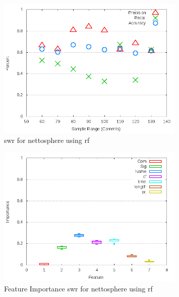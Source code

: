 \begin{figure}[!t]
\centering
\includegraphics[width=0.8\textwidth]{images/rf/test_1/nettosphere_sample_range.png}
\caption{\gls{swr} for nettosphere using \gls{rf}}
\label{fig:test_1_nettosphere_rf}
\end{figure}

\begin{figure}[!t]
\centering
\includegraphics[width=0.8\textwidth]{images/rf/test_1/nettosphere_importance.png}
\caption{Feature Importance \gls{swr} for nettosphere using \gls{rf}}
\label{fig:test_1_nettosphere_rf_importance}
\end{figure}

